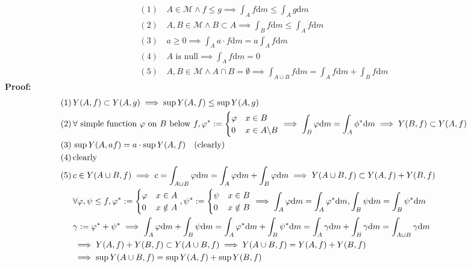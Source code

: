 \documentclass{article}
\newcommand{\bcsl}{\symbol{92}}
\newcommand{\0}{{\bf{0}}}
\newcommand{\1}{{\bf{1}}}
\newcommand{\emset}{\emptyset}
\newcommand{\dif}{\mbox{d}}
\begin{document}
\begin{equation}
\begin{split}
    (1)\,&A\in\mathcal{M}\land f\le g\implies\int_Af\dif m\le\int_Ag\dif m\\
    (2)\,&A,B\in\mathcal{M}\land B\subset A\implies\int_Bf\dif m\le\int_Af\dif m\\
    (3)\,&a\geq0\implies\int_Aa\cdot f\dif m=a\int_Af\dif m\\
    (4)\,&A\mbox{ is null}\implies\int_Af\dif m=0\\
    (5)\,&A,B\in\mathcal{M}\land A\cap B=\emset\implies\int_{A\cup B}f\dif m=\int_Af\dif m+\int_Bf\dif m
\end{split}
\end{equation}
\textbf{Proof:}
\begin{equation}
\begin{split}
    (1)\,&Y(A,f)\subset Y(A,g)\implies\sup Y(A,f)\le\sup Y(A,g)\\
    (2)\,&\forall\mbox{ simple function }\varphi\mbox{ on }B\mbox{ below }f,\varphi^*:=\begin{cases}
        \varphi&x\in B\\
        0&x\in A\bcsl B
    \end{cases}\implies\int_B\varphi \dif m=\int_A\phi^*\dif m\implies Y(B,f)\subset Y(A,f)\\
    (3)\,&\sup Y(A,af)=a\cdot\sup Y(A,f)\quad(\mbox{clearly})\\
    (4)\,&\mbox{clearly}\\
    (5)\,&c\in Y(A\cup B,f)\implies c=\int_{A\cup B}\varphi \dif m=\int_A\varphi \dif m+\int_B\varphi \dif m\implies Y(A\cup B,f)\subset Y(A,f)+Y(B,f)\\
    &\forall\varphi,\psi\le f,\varphi^*:=\begin{cases}
        \varphi&x\in A\\
        0&x\notin A
    \end{cases},\psi^*:=\begin{cases}
        \psi&x\in B\\
        0&x\notin B
    \end{cases}\implies\int_A\varphi \dif m=\int_A\varphi^*\dif m,\int_B\psi \dif m=\int_B\psi^*\dif m\\
    &\gamma:=\varphi^*+\psi^*\implies\int_A\varphi \dif m+\int_B\psi \dif m=\int_A\varphi^*\dif m+\int_B\psi^*\dif m=\int_A\gamma \dif m+\int_B\gamma \dif m=\int_{A\cup B}\gamma \dif m\\
    &\implies Y(A,f)+Y(B,f)\subset Y(A\cup B,f)\implies Y(A\cup B,f)=Y(A,f)+Y(B,f)\\
    &\implies\sup Y(A\cup B,f)=\sup Y(A,f)+\sup Y(B,f)
\end{split}
\end{equation}
\end{document}
